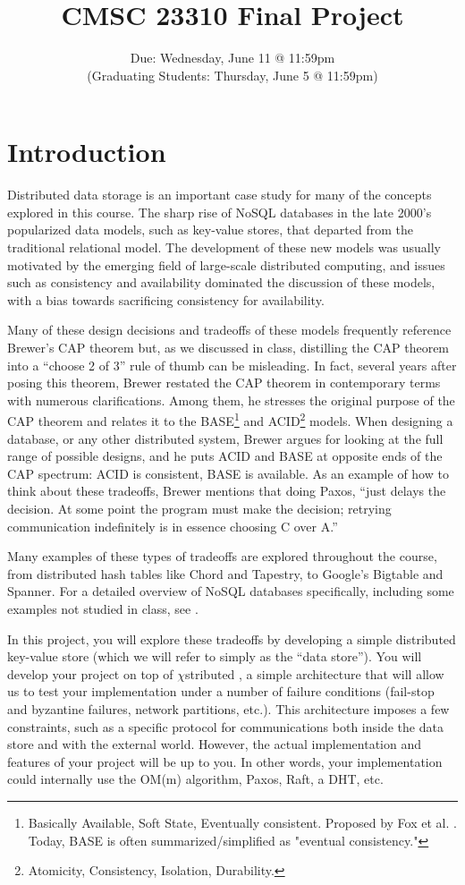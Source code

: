 \documentclass[12pt]{article}
\title{CMSC 23310 Final Project}
\author{}
\date{Due: Wednesday, June 11 @ 11:59pm\\(Graduating Students: Thursday, June 5 @ 11:59pm)}
\newcommand{\chistributed}{$\chi$\textsf{stributed} }
\begin{document}
\maketitle

\section{Introduction}
\label{sec:intro}

Distributed data storage is an important case study for many of the concepts explored in this course. The sharp rise of NoSQL databases in the late 2000's popularized data models, such as key-value stores, that departed from the traditional relational model. The development of these new models was usually motivated by the emerging field of large-scale distributed computing, and issues such as consistency and availability dominated the discussion of these models, with a bias towards sacrificing consistency for availability.

Many of these design decisions and tradeoffs of these models frequently reference Brewer's CAP theorem but, as we discussed in class, distilling the CAP theorem into a ``choose 2 of 3'' rule of thumb can be misleading. In fact, several years after posing this theorem, Brewer \cite{brewer2012} restated the CAP theorem in contemporary terms with numerous clarifications. Among them, he stresses the original purpose of the CAP theorem and relates it to the BASE\footnote{Basically Available, Soft State, Eventually consistent. Proposed by Fox et al. \cite{fox1997}. Today, BASE is often summarized/simplified as "eventual consistency."} and ACID\footnote{Atomicity, Consistency, Isolation, Durability.} models. When designing a database, or any other distributed system, Brewer argues for looking at the full range of possible designs, and he puts ACID and BASE at opposite ends of the CAP spectrum: ACID is consistent, BASE is available. As an example of how to think about these tradeoffs, Brewer mentions that doing Paxos, ``just delays the decision. At some point the program must make the decision; retrying communication indefinitely is in essence choosing C over A.'' \cite{brewer2012}

Many examples of these types of tradeoffs are explored throughout the course, from distributed hash tables like Chord and Tapestry, to Google's Bigtable and Spanner. For a detailed overview of NoSQL databases specifically, including some examples not studied in class, see \cite{strauch}.

In this project, you will explore these tradeoffs by developing a simple distributed key-value store (which we will refer to simply as the ``data store''). You will develop your project on top of \chistributed, a simple architecture that will allow us to test your implementation under a number of failure conditions (fail-stop and byzantine failures, network partitions, etc.). This architecture imposes a few constraints, such as a specific protocol for communications both inside the data store and with the external world. However, the actual implementation and features of your project will be up to you. In other words, your implementation could internally use the OM(m) algorithm, Paxos, Raft, a DHT, etc.
\end{document}
